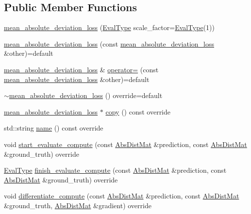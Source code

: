 \subsection*{Public Member Functions}
\begin{DoxyCompactItemize}
\item 
\hyperlink{classlbann_1_1mean__absolute__deviation__loss_ab729227237af711003b6cf4a9d9c9cf1}{mean\+\_\+absolute\+\_\+deviation\+\_\+loss} (\hyperlink{base_8hpp_a3266f5ac18504bbadea983c109566867}{Eval\+Type} scale\+\_\+factor=\hyperlink{base_8hpp_a3266f5ac18504bbadea983c109566867}{Eval\+Type}(1))
\item 
\hyperlink{classlbann_1_1mean__absolute__deviation__loss_a590feaeb1fc096167655ff2fd0b9e9ae}{mean\+\_\+absolute\+\_\+deviation\+\_\+loss} (const \hyperlink{classlbann_1_1mean__absolute__deviation__loss}{mean\+\_\+absolute\+\_\+deviation\+\_\+loss} \&other)=default
\item 
\hyperlink{classlbann_1_1mean__absolute__deviation__loss}{mean\+\_\+absolute\+\_\+deviation\+\_\+loss} \& \hyperlink{classlbann_1_1mean__absolute__deviation__loss_a0c69f9e73a06208ccea56b61ba38726f}{operator=} (const \hyperlink{classlbann_1_1mean__absolute__deviation__loss}{mean\+\_\+absolute\+\_\+deviation\+\_\+loss} \&other)=default
\item 
\hyperlink{classlbann_1_1mean__absolute__deviation__loss_a913786e64e160f849a3b08a7c46ce75a}{$\sim$mean\+\_\+absolute\+\_\+deviation\+\_\+loss} () override=default
\item 
\hyperlink{classlbann_1_1mean__absolute__deviation__loss}{mean\+\_\+absolute\+\_\+deviation\+\_\+loss} $\ast$ \hyperlink{classlbann_1_1mean__absolute__deviation__loss_ad35925ead0532d7893fa9659398ccd45}{copy} () const override
\item 
std\+::string \hyperlink{classlbann_1_1mean__absolute__deviation__loss_a05e9ac150bf3875ebb0a81e07ac3dfa0}{name} () const override
\item 
void \hyperlink{classlbann_1_1mean__absolute__deviation__loss_a4e4340e4370b824c56b76ed59e2ba879}{start\+\_\+evaluate\+\_\+compute} (const \hyperlink{base_8hpp_a9a697a504ae84010e7439ffec862b470}{Abs\+Dist\+Mat} \&prediction, const \hyperlink{base_8hpp_a9a697a504ae84010e7439ffec862b470}{Abs\+Dist\+Mat} \&ground\+\_\+truth) override
\item 
\hyperlink{base_8hpp_a3266f5ac18504bbadea983c109566867}{Eval\+Type} \hyperlink{classlbann_1_1mean__absolute__deviation__loss_ab0a19f6393ef5df9275f1ed4802e8cf6}{finish\+\_\+evaluate\+\_\+compute} (const \hyperlink{base_8hpp_a9a697a504ae84010e7439ffec862b470}{Abs\+Dist\+Mat} \&prediction, const \hyperlink{base_8hpp_a9a697a504ae84010e7439ffec862b470}{Abs\+Dist\+Mat} \&ground\+\_\+truth) override
\item 
void \hyperlink{classlbann_1_1mean__absolute__deviation__loss_a3ed0cbe4e405c10bf3f6a80eb693390e}{differentiate\+\_\+compute} (const \hyperlink{base_8hpp_a9a697a504ae84010e7439ffec862b470}{Abs\+Dist\+Mat} \&prediction, const \hyperlink{base_8hpp_a9a697a504ae84010e7439ffec862b470}{Abs\+Dist\+Mat} \&ground\+\_\+truth, \hyperlink{base_8hpp_a9a697a504ae84010e7439ffec862b470}{Abs\+Dist\+Mat} \&gradient) override
\end{DoxyCompactItemize}

